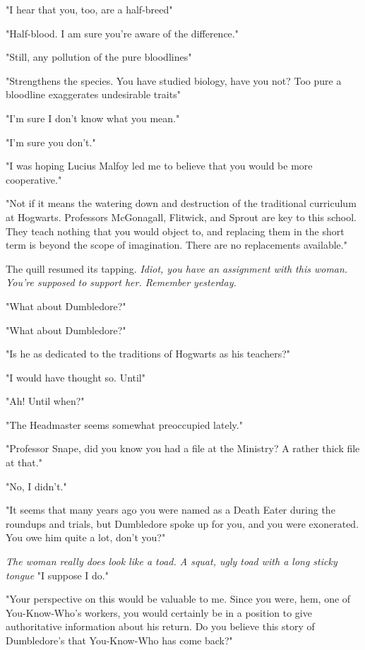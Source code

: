 "I hear that you, too, are a half-breed{\el}"

"Half-blood. I am sure you're aware of the difference."

"Still, any pollution of the pure bloodlines{\el}"

"Strengthens the species. You have studied biology, have you not? Too pure a bloodline exaggerates undesirable traits{\el}"

"I'm sure I don't know what you mean."

"I'm sure you don't."

"I was hoping{\el} Lucius Malfoy led me to believe{\el} that you would be more cooperative."

"Not if it means the watering down and destruction of the traditional curriculum at Hogwarts. Professors McGonagall, Flitwick, and Sprout are key to this school. They teach nothing that you would object to, and replacing them in the short term is beyond the scope of imagination. There are no replacements available."

The quill resumed its tapping. \emph{Idiot, you have an assignment with this woman. You're supposed to support her. Remember yesterday.}

"What about Dumbledore?"

"What about Dumbledore?"

"Is he as dedicated to the traditions of Hogwarts as his teachers?"

"I would have thought so. Until{\el}"

"Ah! Until when?"

"The Headmaster seems somewhat preoccupied lately."

"Professor Snape, did you know you had a file at the Ministry? A rather thick file at that."

"No, I didn't."

"It seems that many years ago you were named as a Death Eater during the roundups and trials, but Dumbledore spoke up for you, and you were exonerated. You owe him quite a lot, don't you?"

\emph{The woman really does look like a toad. A squat, ugly toad with a long sticky tongue{\el}} "I suppose I do."

"Your perspective on this would be valuable to me. Since you were, hem, one of You-Know-Who's workers, you would certainly be in a position to give authoritative information about his return. Do you believe this story of Dumbledore's that You-Know-Who has come back?"

